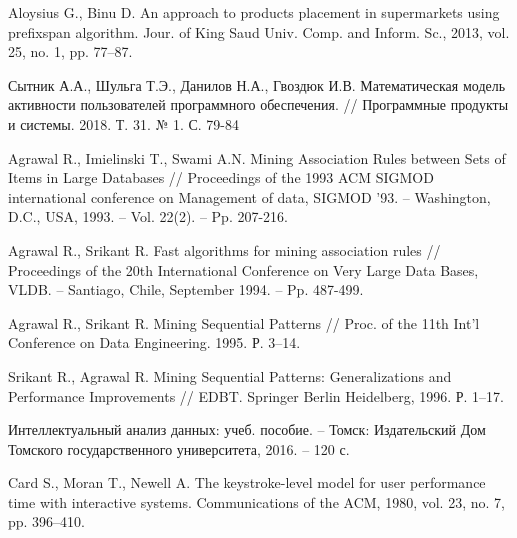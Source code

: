 \begin{thebibliography}{1}
	Aloysius G., Binu D.
	An approach to products placement in supermarkets using prefixspan algorithm.
	Jour. of King Saud Univ. Comp. and Inform. Sc., 2013, vol. 25, no. 1, pp. 77–87.
	
	Сытник А.А., Шульга Т.Э., Данилов Н.А., Гвоздюк И.В.
	Математическая модель активности пользователей программного обеспечения.
	// Программные продукты и системы. 2018. Т. 31. № 1. С. 79-84 
	
	Agrawal R., Imielinski T., Swami A.N.
	Mining Association Rules between Sets of Items in Large Databases
	// Proceedings of the 1993 ACM SIGMOD international conference on Management of data, SIGMOD '93. – Washington, D.C., USA, 1993. – Vol. 22(2). – Pp. 207-216.
	
	Agrawal R., Srikant R.
	Fast algorithms for mining association rules
	// Proceedings of the 20th International Conference on Very Large Data Bases, VLDB. – Santiago, Chile, September 1994. – Pp. 487-499.
	
	Agrawal R., Srikant R. Mining Sequential Patterns // Proc. of the 11th Int’l
	Conference on Data Engineering. 1995. Р. 3–14.
	
	Srikant R., Agrawal R. Mining Sequential Patterns: Generalizations and
	Performance Improvements // EDBT. Springer Berlin Heidelberg, 1996.
	Р. 1–17.
	
	Интеллектуальный анализ данных: учеб. пособие. –
	Томск: Издательский Дом Томского государственного
	университета, 2016. – 120 с.
	
	Card S., Moran T., Newell A.
	The keystroke-level model for user performance time with interactive systems.
	Communications of the ACM, 1980, vol. 23, no. 7, pp. 396–410.
	
	
\end{thebibliography}
